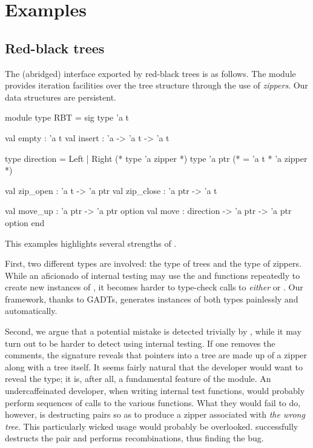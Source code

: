 \section{Examples}

\subsection{Red-black trees}
The (abridged) interface exported by red-black trees is as follows. The module
provides iteration facilities over the tree structure through the use of
\cite{huet-zipper-97}
\emph{zippers}. Our data structures are persistent.
%
\begin{ocamlcode}
module type RBT = sig
  type 'a t

  val empty : 'a t
  val insert : 'a -> 'a t -> 'a t

  type direction = Left | Right
  (* type 'a zipper *)
  type 'a ptr (* = 'a t * 'a zipper *)

  val zip_open : 'a t -> 'a ptr
  val zip_close : 'a ptr -> 'a t

  val move_up : 'a ptr -> 'a ptr option
  val move : direction -> 'a ptr -> 'a ptr option
end
\end{ocamlcode}
%
This examples highlights several strengths of \arti.

First, two different types are involved: the type of trees and the type of
zippers. While an aficionado of internal testing may use the  and
 functions repeatedly to create new instances of , it
becomes harder to type-check calls to \emph{either}  or
. Our framework, thanks to GADTs, generates instances of both
types painlessly and automatically.

Second, we argue that a potential mistake is detected trivially by \arti, while
it may turn out to be harder to detect using internal testing. If one removes
the comments, the signature reveals that pointers into a tree are made up of a
zipper along with a tree itself. It seems fairly natural that the developer
would want to reveal the  type; it is, after all, a fundamental
feature of the module. An undercaffeinated developer, when writing internal test
functions, would probably perform sequences of calls to the various functions.
What they would fail to do, however, is destructing pairs so as to produce
a zipper associated with \emph{the wrong tree}. This particularly wicked usage
would probably be overlooked. \arti successfully destructs the pair and performs
recombinations, thus finding the bug.

